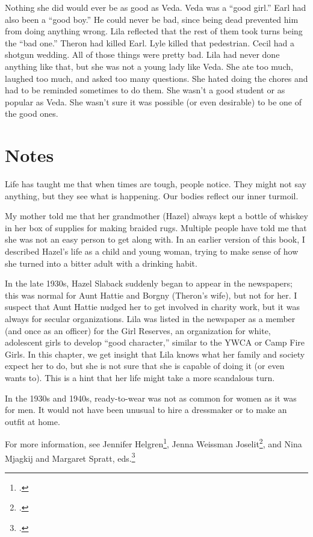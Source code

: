 \documentclass[
  letterpaper,
]{book}
\begin{document}
Nothing she did would ever be as good as Veda. Veda was a ``good girl.''
Earl had also been a ``good boy.'' He could never be bad, since being
dead prevented him from doing anything wrong. Lila reflected that the
rest of them took turns being the ``bad one.'' Theron had killed Earl.
Lyle killed that pedestrian. Cecil had a shotgun wedding. All of those
things were pretty bad. Lila had never done anything like that, but she
was not a young lady like Veda. She ate too much, laughed too much, and
asked too many questions. She hated doing the chores and had to be
reminded sometimes to do them. She wasn't a good student or as popular
as Veda. She wasn't sure it was possible (or even desirable) to be one
of the good ones.

\section{Notes}\label{notes-18}

Life has taught me that when times are tough, people notice. They might
not say anything, but they see what is happening. Our bodies reflect our
inner turmoil.

My mother told me that her grandmother (Hazel) always kept a bottle of
whiskey in her box of supplies for making braided rugs. Multiple people
have told me that she was not an easy person to get along with. In an
earlier version of this book, I described Hazel's life as a child and
young woman, trying to make sense of how she turned into a bitter adult
with a drinking habit.

In the late 1930s, Hazel Slaback suddenly began to appear in the
newspapers; this was normal for Aunt Hattie and Borgny (Theron's wife),
but not for her. I suspect that Aunt Hattie nudged her to get involved
in charity work, but it was always for secular organizations. Lila was
listed in the newspaper as a member (and once as an officer) for the
Girl Reserves, an organization for white, adolescent girls to develop
``good character,'' similar to the YWCA or Camp Fire Girls. In this
chapter, we get insight that Lila knows what her family and society
expect her to do, but she is not sure that she is capable of doing it
(or even wants to). This is a hint that her life might take a more
scandalous turn.

In the 1930s and 1940s, ready-to-wear was not as common for women as it
was for men. It would not have been unusual to hire a dressmaker or to
make an outfit at home.

For more information, see Jennifer Helgren\footnote{.}, Jenna Weissman
Joselit\footnote{.}, and Nina Mjagkij and Margaret Spratt,
eds.\footnote{.}
\end{document}
